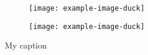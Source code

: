 \documentclass{beamer}
\renewcommand\thesubfigure{\normalfont(\alph{subfigure})}
\begin{document}
    \begin{frame}
        \begin{figure}[h!]
            \begin{subfigure}{.49\textwidth}
                \renewcommand\thesubfigure{\fontsize{5}{8}\selectfont (\alph{subfigure})}
                \texttt{[image: example-image-duck]}
                \caption{ }
                \label{fig7a}
                \renewcommand\thesubfigure{\normalfont (\alph{subfigure})}
            \end{subfigure} 
            \begin{subfigure}{.49\textwidth}
                \texttt{[image: example-image-duck]}
                \caption{ }
                \label{fig7b}
            \end{subfigure}
            \caption{My caption}
            \label{f7}
        \end{figure}
    \end{frame}
\end{document}
